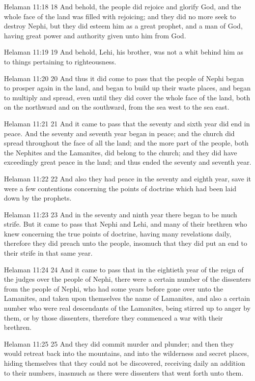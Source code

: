 Helaman 11:18
 18 And behold, the people did rejoice and glorify God, and the
whole face of the land was filled with rejoicing; and they did no
more seek to destroy Nephi, but they did esteem him as a great
prophet, and a man of God, having great power and authority given
unto him from God.

Helaman 11:19
 19 And behold, Lehi, his brother, was not a whit behind him as
to things pertaining to righteousness.

Helaman 11:20
 20 And thus it did come to pass that the people of Nephi began
to prosper again in the land, and began to build up their waste
places, and began to multiply and spread, even until they did
cover the whole face of the land, both on the northward and on
the southward, from the sea west to the sea east.

Helaman 11:21
 21 And it came to pass that the seventy and sixth year did end
in peace. And the seventy and seventh year began in peace; and
the church did spread throughout the face of all the land; and
the more part of the people, both the Nephites and the Lamanites,
did belong to the church; and they did have exceedingly great
peace in the land; and thus ended the seventy and seventh year.

Helaman 11:22
 22 And also they had peace in the seventy and eighth year, save
it were a few contentions concerning the points of doctrine which
had been laid down by the prophets.

Helaman 11:23
 23 And in the seventy and ninth year there began to be much
strife. But it came to pass that Nephi and Lehi, and many of
their brethren who knew concerning the true points of doctrine,
having many revelations daily, therefore they did preach unto the
people, insomuch that they did put an end to their strife in that
same year.

Helaman 11:24
 24 And it came to pass that in the eightieth year of the reign
of the judges over the people of Nephi, there were a certain
number of the dissenters from the people of Nephi, who had some
years before gone over unto the Lamanites, and taken upon
themselves the name of Lamanites, and also a certain number who
were real descendants of the Lamanites, being stirred up to anger
by them, or by those dissenters, therefore they commenced a war
with their brethren.

Helaman 11:25
 25 And they did commit murder and plunder; and then they would
retreat back into the mountains, and into the wilderness and
secret places, hiding themselves that they could not be
discovered, receiving daily an addition to their numbers,
inasmuch as there were dissenters that went forth unto them.

